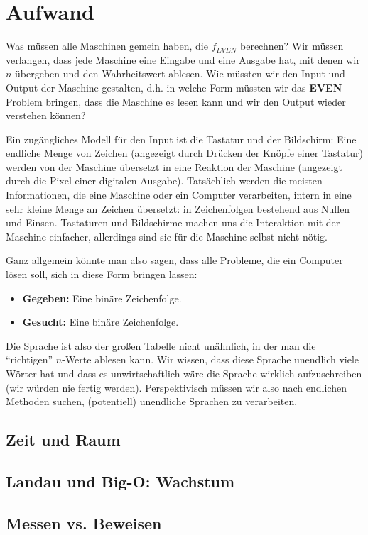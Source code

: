 \chapter{Aufwand}

 Was müssen alle Maschinen gemein haben, die $f_{EVEN}$ berechnen?
 Wir müssen verlangen,
 dass jede Maschine eine Eingabe und eine Ausgabe hat,
 mit denen wir $n$ übergeben und den Wahrheitswert ablesen.
 Wie müssten wir den Input und Output der Maschine gestalten,
 d.h. in welche Form müssten wir das \textbf{EVEN}-Problem bringen,
 dass die Maschine es lesen kann und wir den Output wieder verstehen können? 

 Ein zugängliches Modell für den Input ist die Tastatur und der Bildschirm:
 Eine endliche Menge von Zeichen (angezeigt durch Drücken der Knöpfe einer Tastatur)
 werden von der Maschine übersetzt in eine Reaktion der Maschine 
 (angezeigt durch die Pixel einer digitalen Ausgabe).
 Tatsächlich werden die meisten Informationen,
 die eine Maschine oder ein Computer verarbeiten,
 intern in eine sehr kleine Menge an Zeichen übersetzt:
 in Zeichenfolgen bestehend aus Nullen und Einsen.
 Tastaturen und Bildschirme machen uns die Interaktion mit der Maschine einfacher,
 allerdings sind sie für die Maschine selbst nicht nötig.

 Ganz allgemein könnte man also sagen, dass alle Probleme, die ein Computer lösen soll,
sich in diese Form bringen lassen:
 \begin{itemize}
    \item \textbf{Gegeben:} Eine binäre Zeichenfolge.
    \item \textbf{Gesucht:} Eine binäre Zeichenfolge.
 \end{itemize}

 Die Sprache ist also der großen Tabelle nicht unähnlich,
 in der man die ``richtigen'' $n$-Werte ablesen kann.
 Wir wissen, dass diese Sprache unendlich viele Wörter hat und dass es unwirtschaftlich wäre
 die Sprache wirklich aufzuschreiben (wir würden nie fertig werden).
 Perspektivisch müssen wir also nach endlichen Methoden suchen,
 (potentiell) unendliche Sprachen zu verarbeiten.

\section{Zeit und Raum}
\section{Landau und Big-O: Wachstum}
\section{Messen vs. Beweisen}\label{messenVsBeweisen}

